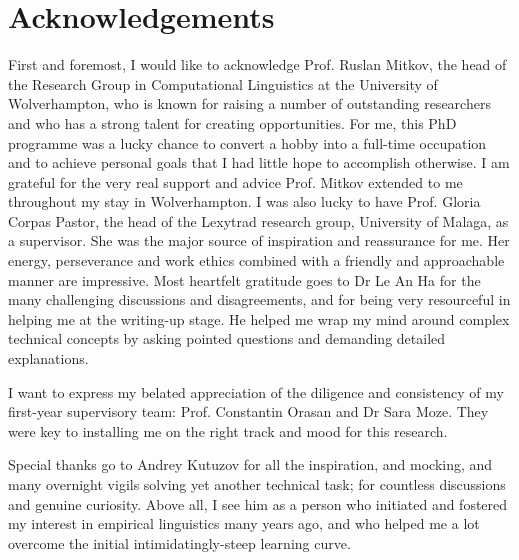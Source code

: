 
\chapter*{Acknowledgements}


First and foremost, I would like to acknowledge Prof. Ruslan Mitkov, the head of the Research Group in Computational Linguistics at the University of Wolverhampton, who is known for raising a number of outstanding researchers and who has a strong talent for creating opportunities. For me, this PhD programme was a lucky chance to convert a hobby into a full-time occupation and to achieve personal goals that I had little hope to accomplish otherwise. I am grateful for the very real support and advice Prof. Mitkov extended to me throughout my stay in Wolverhampton. %
I was also lucky to have Prof. Gloria Corpas Pastor, the head of the Lexytrad research group, University of Malaga, as a supervisor. She was the major source of inspiration and reassurance for me. Her energy, perseverance and work ethics combined with a friendly and approachable manner are impressive. 
Most heartfelt gratitude goes to Dr Le An Ha for the many challenging discussions and disagreements, and for being very resourceful in helping me at the writing-up stage. He helped me wrap my mind around complex technical concepts by asking pointed questions and demanding detailed explanations. 

I want to express my belated appreciation of the diligence and consistency of my first-year supervisory team: Prof. Constantin Orasan and Dr Sara Moze. They were key to installing me on the right track and mood for this research. 

Special thanks go to Andrey Kutuzov for all the inspiration, and mocking, and many overnight vigils solving yet another technical task; for countless discussions and genuine curiosity. Above all, I see him as a person who initiated and fostered my interest in empirical linguistics many years ago, and who helped me a lot overcome the initial intimidatingly-steep learning curve.

